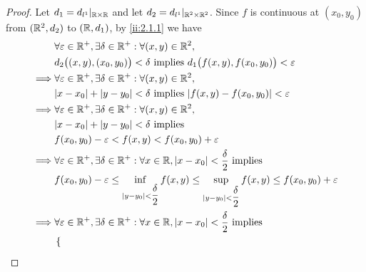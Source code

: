 \begin{proof}
  Let \(d_1 = d_{l^1}|_{\mathbb{R} \times \mathbb{R}}\) and let \(d_2 = d_{l^1}|_{\mathbb{R}^2 \times \mathbb{R}^2}\).
  Since \(f\) is continuous at \((x_0, y_0)\) from \((\mathbb{R}^2, d_2)\) to \((\mathbb{R}, d_1)\), by \cref{ii:2.1.1} we have
  \begin{align*}
             & \forall \varepsilon \in \R^+, \exists \delta \in \R^+ : \forall (x, y) \in \R^2,                                                                                     \\
             & d_2\big((x, y), (x_0, y_0)\big) < \delta \text{ implies } d_1\big(f(x, y), f(x_0, y_0)\big) < \varepsilon                                                            \\
    \implies & \forall \varepsilon \in \R^+, \exists \delta \in \R^+ : \forall (x, y) \in \R^2,                                                                                     \\
             & \abs{x - x_0} + \abs{y - y_0} < \delta \text{ implies } \abs{f(x, y) - f(x_0, y_0)} < \varepsilon                                                                    \\
    \implies & \forall \varepsilon \in \R^+, \exists \delta \in \R^+ : \forall (x, y) \in \R^2,                                                                                     \\
             & \abs{x - x_0} + \abs{y - y_0} < \delta \text{ implies}                                                                                                               \\
             & f(x_0, y_0) - \varepsilon < f(x, y) < f(x_0, y_0) + \varepsilon                                                                                                      \\
    \implies & \forall \varepsilon \in \R^+, \exists \delta \in \R^+ : \forall x \in \R, \abs{x - x_0} < \dfrac{\delta}{2} \text{ implies}                                          \\
             & f(x_0, y_0) - \varepsilon \leq \inf_{\abs{y - y_0} < \dfrac{\delta}{2}} f(x, y) \leq \sup_{\abs{y - y_0} < \dfrac{\delta}{2}} f(x, y) \leq f(x_0, y_0) + \varepsilon \\
    \implies & \forall \varepsilon \in \R^+, \exists \delta \in \R^+ : \forall x \in \R, \abs{x - x_0} < \dfrac{\delta}{2} \text{ implies}                                          \\
             & \begin{dcases}

\end{dcases}
\end{align*}
\end{proof}
